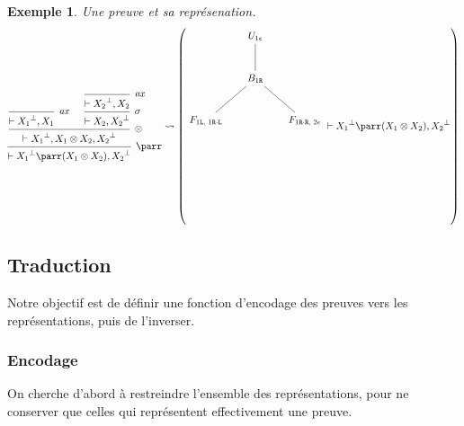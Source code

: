 \documentclass[11pt,a4paper]{article}
\newtheorem{example}{Exemple}
\newcommand*{\orth}{^\perp}
\newcommand*{\tensor}{\otimes}
\newcommand*{\axv}[1]{\infer{0}[\ensuremath{\mathit{ax}}]{\vdash #1}}
\newcommand*{\tensorv}[1]{\infer{2}[\ensuremath{\tensor}]{\vdash #1}}
\newcommand*{\parrv}[1]{\infer{1}[\ensuremath{\parr}]{\vdash #1}}
\newcommand*{\permv}[1]{\infer{1}[\ensuremath{\sigma}]{\vdash #1}}
\newcommand*{\Left}{\textnormal{\texttt{L}}}
\newcommand*{\Right}{\textnormal{\texttt{R}}}
\begin{document}
\begin{example}
Une preuve et sa représenation.
\begin{equation*}
\begin{prooftree}
    \axv{{X_1}\orth, X_1}
    \axv{{X_2}\orth, X_2}
    \permv{X_2, {X_2}\orth}
    \tensorv{{X_1}\orth, X_1 \tensor X_2, {X_2}\orth}
    \parrv{{X_1}\orth \parr (X_1 \tensor X_2), {X_2}\orth}
\end{prooftree}
\mathrel{\leadsto}
\left(
\begin{tikzpicture}%
    [level distance=1.5cm,
    level 2/.style={sibling distance=3.5cm}]
    \node {$U_{1 \epsilon}$}
    child {node {$B_{1 \Right}$}
        child {node {$F_{1 \Left, \; 1 \Right \cdot \Left}$}}
        child {node {$F_{1 \Right \cdot \Right, \; 2 \epsilon}$}}
    };
\end{tikzpicture}
\vdash {X_1}\orth \parr (X_1 \tensor X_2), {X_2}\orth
\right)
\end{equation*}
\end{example}

\subsection{Traduction}
Notre objectif est de définir une fonction d'encodage des preuves vers les représentations, puis de l'inverser.

\subsubsection{Encodage}
On cherche d'abord à restreindre l'ensemble des représentations, pour ne conserver que celles qui représentent effectivement une preuve.
\end{document}
